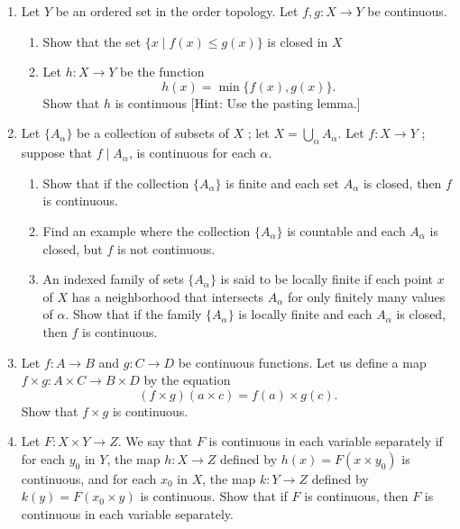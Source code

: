\begin{enumerate}[itemsep=0.4em, parsep=0pt, topsep=0pt, partopsep=0pt, leftmargin=*, label=\arabic*., ref=\arabic*]
\begin{enumerate}[itemsep=0.2em, parsep=0pt, topsep=0pt, partopsep=0pt, leftmargin=*, label=(\alph*), align=left]
  \item Can you conjecture what functions \(f : \mathbb{R} \rightarrow \mathbb{R}\) are continuous when considered as maps from \(\mathbb{R}\) to \(\mathbb{R}_{\ell }\) ? As maps from \(\mathbb{R}_{\ell }\) to \(\mathbb{R}_{\ell }\) ? We shall return to this question in Chapter 3.
  \end{enumerate}
\item Let \(Y\) be an ordered set in the order topology. Let \(f,g : X \rightarrow Y\) be continuous.
  \begin{enumerate}[itemsep=0.2em, parsep=0pt, topsep=0pt, partopsep=0pt, leftmargin=*, label=(\alph*), align=left]
  \item Show that the set \(\{ x \mid f(x) \leq g(x) \}\) is closed in \(X\)
  \item Let \(h : X \rightarrow Y\) be the function \[ h(x) = \min \{ f(x),g(x) \}. \] Show that \(h\) is continuous [Hint: Use the pasting lemma.]
  \end{enumerate}
\item Let \(\{ A_{\alpha }\}\) be a collection of subsets of \(X\) ; let \(X = \mathop{\bigcup }\limits_{\alpha }A_{\alpha }\). Let \(f : X \rightarrow Y\) ; suppose that \(f \mid {A}_{\alpha }\), is continuous for each \(\alpha\).
  \begin{enumerate}[itemsep=0.2em, parsep=0pt, topsep=0pt, partopsep=0pt, leftmargin=*, label=(\alph*), align=left]
  \item Show that if the collection \(\{ A_{\alpha }\}\) is finite and each set \(A_{\alpha }\) is closed, then \(f\) is continuous.
  \item Find an example where the collection \(\{ A_{\alpha }\}\) is countable and each \(A_{\alpha }\) is closed, but \(f\) is not continuous.
  \item An indexed family of sets \(\{ A_{\alpha }\}\) is said to be locally finite if each point \(x\) of \(X\) has a neighborhood that intersects \(A_{\alpha }\) for only finitely many values of \(\alpha\). Show that if the family \(\{ A_{\alpha }\}\) is locally finite and each \(A_{\alpha }\) is closed, then \(f\) is continuous.
  \end{enumerate}
\item Let \(f : A \rightarrow B\) and \(g : C \rightarrow D\) be continuous functions. Let us define a map \(f \times g : A \times C \rightarrow B \times D\) by the equation \[ ( {f \times g}) ( {a \times c}) = f( a) \times g( c). \] Show that \(f \times g\) is continuous.
\item Let \(F : X \times Y \rightarrow Z\). We say that \(F\) is continuous in each variable separately if for each \(y_{0}\) in \(Y\), the map \(h : X \rightarrow Z\) defined by \(h(x) = F( {x \times {y}_{0}})\) is continuous, and for each \(x_{0}\) in \(X\), the map \(k : Y \rightarrow Z\) defined by \(k( y) = F( {x_{0} \times y})\) is continuous. Show that if \(F\) is continuous, then \(F\) is continuous in each variable separately.

\end{enumerate}
